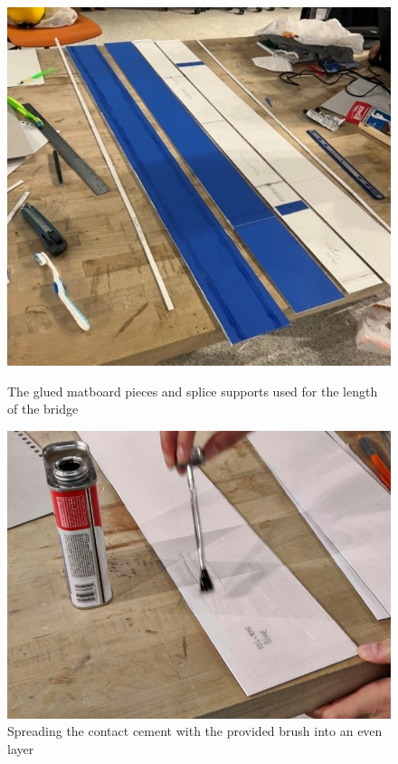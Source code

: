 \documentclass[11pt]{article}
\begin{document}
\begin{figure}[h]
    \centering
    \begin{minipage}[t]{.393\textwidth}
        \centering
        \includegraphics[width=\textwidth]{img/construction_7.jpg}
        \caption{The glued matboard pieces and splice supports used for the length of the bridge}
        \label{c7}
    \end{minipage}
    \hspace{.02\linewidth}
    \begin{minipage}[t]{.49\textwidth}
        \centering
        \includegraphics[width=\textwidth]{img/construction_8.jpg}
        \caption{Spreading the contact cement with the provided brush into an even layer}
        \label{c8}
    \end{minipage}
\end{figure}
\end{document}
